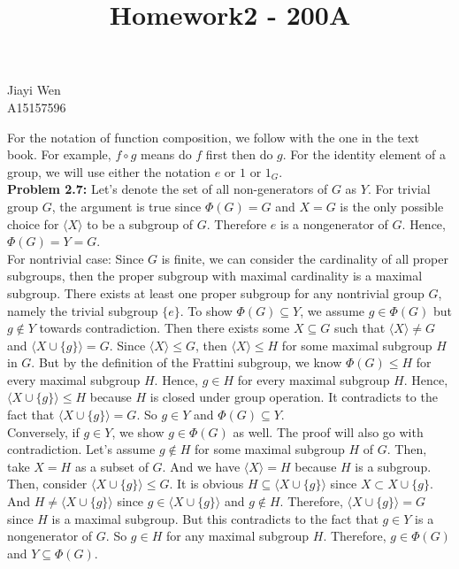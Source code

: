 \documentclass[12pt]{amsart}
\begin{document}
    \title{Homework2 - 200A}
    \maketitle
    \begin{center}
        Jiayi Wen\\
        A15157596
    \end{center}
    \indent For the notation of function composition, we follow with the one in the text book. For example, $f \circ g$ means do $f$ first then do $g$. For the identity element of a group, we will use either the notation $e$ or $1$ or $1_G$.\\
    \textbf{Problem 2.7:} Let's denote the set of all non-generators of $G$ as $Y$. For trivial group $G$, the argument is true since $\Phi(G)=G$ and $X=G$ is the only possible choice for $\langle X\rangle$ to be a subgroup of $G$. Therefore $e$ is a nongenerator of $G$. Hence, $\Phi(G)=Y=G$.\\
    For nontrivial case: Since $G$ is finite, we can consider the cardinality of all proper subgroups, then the proper subgroup with maximal cardinality is a maximal subgroup. There exists at least one proper subgroup for any nontrivial group $G$, namely the trivial subgroup $\{e\}$. To show $\Phi(G)\subseteq Y$, we assume $g\in\Phi(G)$ but $g\notin Y$ towards contradiction. Then there exists some $X\subseteq G$ such that $\langle X\rangle\neq G$ and $\langle X\cup \{g\}\rangle =G$. Since $\langle X\rangle\leq G$, then $\langle X\rangle\leq H$ for some maximal subgroup $H$ in $G$. But by the definition of the Frattini subgroup, we know $\Phi(G)\leq H$ for every maximal subgroup $H$. Hence, $g\in H$ for every maximal subgroup $H$. Hence, $\langle X\cup \{g\}\rangle \leq H$ because $H$ is closed under group operation. It contradicts to the fact that $\langle X\cup\{g\}\rangle =G$. So $g\in Y$ and $\Phi(G)\subseteq Y$.\\
    Conversely, if $g\in Y$, we show $g\in \Phi(G)$ as well. The proof will also go with contradiction. Let's assume $g\notin H$ for some maximal subgroup $H$ of $G$. Then, take $X=H$ as a subset of $G$. And we have $\langle X\rangle=H$ because $H$ is a subgroup. Then, consider $\langle X\cup\{g\}\rangle\leq G$. It is obvious $H\subseteq  \langle X\cup\{g\}\rangle$ since $X\subset X\cup \{g\}$. And $H\neq \langle X\cup\{g\}\rangle$ since $g\in \langle X\cup\{g\}\rangle$ and $g\notin H$. Therefore, $\langle X\cup\{g\}\rangle=G$ since $H$ is a maximal subgroup. But this contradicts to the fact that $g\in Y$ is a nongenerator of $G$. So $g\in H$ for any maximal subgroup $H$. Therefore, $g\in \Phi(G)$ and $Y\subseteq \Phi(G)$. 
\end{document}
